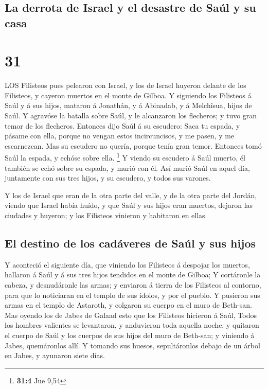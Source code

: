 \hypertarget{la-derrota-de-israel-y-el-desastre-de-sauxfal-y-su-casa}{%
\subsection{La derrota de Israel y el desastre de Saúl y su
casa}\label{la-derrota-de-israel-y-el-desastre-de-sauxfal-y-su-casa}}

\hypertarget{section-30}{%
\section{31}\label{section-30}}

 LOS Filisteos pues pelearon con Israel, y los de Israel
huyeron delante de los Filisteos, y cayeron muertos en el monte de
Gilboa.  Y siguiendo los Filisteos á Saúl y á sus hijos,
mataron á Jonathán, y á Abinadab, y á Melchîsua, hijos de Saúl.
 Y agravóse la batalla sobre Saúl, y le alcanzaron los
flecheros; y tuvo gran temor de los flecheros.  Entonces
dijo Saúl á su escudero: Saca tu espada, y pásame con ella, porque no
vengan estos incircuncisos, y me pasen, y me escarnezcan. Mas su
escudero no quería, porque tenía gran temor. Entonces tomó Saúl la
espada, y echóse sobre ella. \footnote{\textbf{31:4} Jue 9,54}
 Y viendo su escudero á Saúl muerto, él también se echó
sobre su espada, y murió con él.  Así murió Saúl en aquel
día, juntamente con sus tres hijos, y su escudero, y todos sus varones.

 Y los de Israel que eran de la otra parte del valle, y de
la otra parte del Jordán, viendo que Israel había huído, y que Saúl y
sus hijos eran muertos, dejaron las ciudades y huyeron; y los Filisteos
vinieron y habitaron en ellas.

\hypertarget{el-destino-de-los-caduxe1veres-de-sauxfal-y-sus-hijos}{%
\subsection{El destino de los cadáveres de Saúl y sus
hijos}\label{el-destino-de-los-caduxe1veres-de-sauxfal-y-sus-hijos}}

 Y aconteció el siguiente día, que viniendo los Filisteos á
despojar los muertos, hallaron á Saúl y á sus tres hijos tendidos en el
monte de Gilboa;  Y cortáronle la cabeza, y desnudáronle las
armas; y enviaron á tierra de los Filisteos al contorno, para que lo
noticiaran en el templo de sus ídolos, y por el pueblo.  Y
pusieron sus armas en el templo de Astaroth, y colgaron su cuerpo en el
muro de Beth-san.  Mas oyendo los de Jabes de Galaad esto
que los Filisteos hicieron á Saúl,  Todos los hombres
valientes se levantaron, y anduvieron toda aquella noche, y quitaron el
cuerpo de Saúl y los cuerpos de sus hijos del muro de Beth-san; y
viniendo á Jabes, quemáronlos allí.  Y tomando sus huesos,
sepultáronlos debajo de un árbol en Jabes, y ayunaron siete días.
